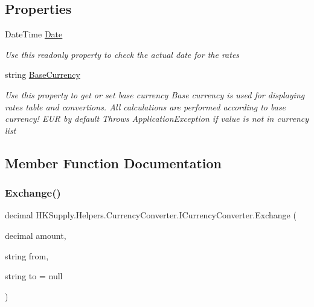\subsection*{Properties}
\begin{DoxyCompactItemize}
\item 
Date\+Time \mbox{\hyperlink{interface_h_k_supply_1_1_helpers_1_1_currency_converter_1_1_i_currency_converter_ab0194cbb76f7209c2b23ee923cade86f}{Date}}
\begin{DoxyCompactList}\small\item\em Use this readonly property to check the actual date for the rates \end{DoxyCompactList}\item 
string \mbox{\hyperlink{interface_h_k_supply_1_1_helpers_1_1_currency_converter_1_1_i_currency_converter_a98a181a28a0cb293c8ab0e0635050539}{Base\+Currency}}
\begin{DoxyCompactList}\small\item\em Use this property to get or set base currency Base currency is used for displaying rates table and convertions. All calculations are performed according to base currency! E\+UR by default Throws Application\+Exception if value is not in currency list \end{DoxyCompactList}\end{DoxyCompactItemize}


\subsection{Member Function Documentation}
\mbox{\label{interface_h_k_supply_1_1_helpers_1_1_currency_converter_1_1_i_currency_converter_afc064d13f2989af64d7887d3b3aa8767}} 
\subsubsection{\texorpdfstring{Exchange()}{Exchange()}}
{\footnotesize\ttfamily decimal H\+K\+Supply.\+Helpers.\+Currency\+Converter.\+I\+Currency\+Converter.\+Exchange (\begin{DoxyParamCaption}\item[{decimal}]{amount,  }\item[{string}]{from,  }\item[{string}]{to = {\ttfamily null} }\end{DoxyParamCaption})}



